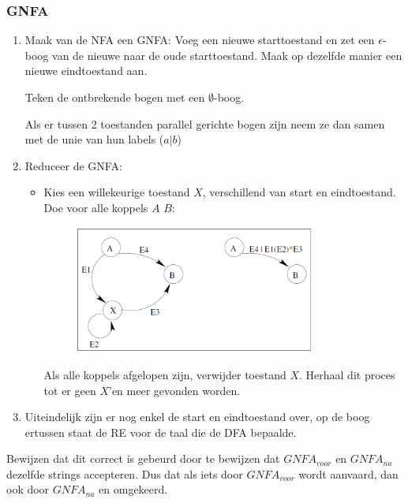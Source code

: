 \documentclass{article}
\begin{document}
        \subsubsection{GNFA}
            \begin{enumerate}
                \item Maak van de NFA een GNFA: Voeg een nieuwe starttoestand en zet een $\epsilon$-boog van de nieuwe naar de oude starttoestand. Maak op dezelfde manier een nieuwe eindtoestand aan.

                Teken de ontbrekende bogen met een $\emptyset$-boog.

                Als er tussen 2 toestanden parallel gerichte bogen zijn neem ze dan samen met de unie van hun labels ($a\vert b$)

                \item Reduceer de GNFA:
                \begin{itemize}
                    \item Kies een willekeurige toestand $X$, verschillend van start en eindtoestand. Doe voor alle koppels $A$ $B$:
                    \begin{figure}[h!]
                        \centering
                        \includegraphics[width=0.8\textwidth]{assets/GNFA-reductie.PNG}
                    \end{figure}

                    Als alle koppels afgelopen zijn, verwijder toestand $X$. Herhaal dit proces tot er geen $X$'en meer gevonden worden.
                \end{itemize}
                \item Uiteindelijk zijn er nog enkel de start en eindtoestand over, op de boog ertussen staat de RE voor de taal die de DFA bepaalde.
            \end{enumerate}

            Bewijzen dat dit correct is gebeurd door te bewijzen dat $GNFA_{voor}$ en $GNFA_{na}$ dezelfde strings accepteren. Dus dat als iets door $GNFA_{voor}$ wordt aanvaard, dan ook door $GNFA_{na}$ en omgekeerd.
\newpage
\end{document}
